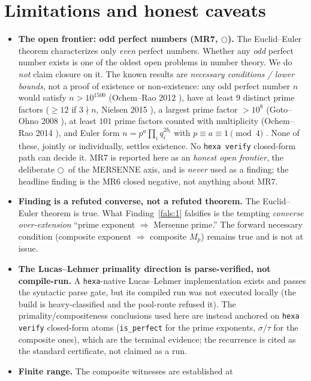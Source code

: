 \documentclass[11pt,a4paper]{article}
\newcommand{\tierO}{\textcolor{orange!85!black}{$\bigcirc$}}       %
\newcommand{\sig}{\sigma}
\newcommand{\Mp}{M_p}
\theoremstyle{definition}
\begin{document}
\section{Limitations and honest caveats}
\label{sec:caveats}

\begin{itemize}\itemsep0.3em
\item \textbf{The open frontier: odd perfect numbers (MR7, \tierO).} The
Euclid--Euler theorem characterizes only \emph{even} perfect numbers. Whether any
\emph{odd} perfect number exists is one of the oldest open problems in number
theory. We do \emph{not} claim closure on it. The known results are
\emph{necessary conditions / lower bounds}, not a proof of existence or
non-existence: any odd perfect number $n$ would satisfy $n > 10^{1500}$
(Ochem--Rao 2012 \citep{ochem-rao-2012}), have at least $9$ distinct prime
factors ($\geq 12$ if $3\nmid n$, Nielsen 2015 \citep{nielsen-2015}), a largest
prime factor $> 10^8$ (Goto--Ohno 2008 \citep{goto-ohno}), at least $101$ prime
factors counted with multiplicity (Ochem--Rao 2014 \citep{ochem-rao-2014}), and
Euler form $n = p^a\prod_i q_i^{2b_i}$ with $p\equiv a\equiv 1\pmod 4$
\citep{euler1849}. None of these, jointly or individually, settles existence. No
\texttt{hexa verify} closed-form path can decide it. MR7 is reported here as an
\emph{honest open frontier}, the deliberate \tierO\ of the MERSENNE axis, and is
\emph{never} used as a finding; the headline finding is the MR6 closed negative,
not anything about MR7.
\item \textbf{Finding is a refuted converse, not a refuted theorem.} The
Euclid--Euler theorem is true. What Finding~\ref{fals:1} falsifies is the
tempting \emph{converse over-extension} ``prime exponent $\Rightarrow$ Mersenne
prime.'' The forward necessary condition (composite exponent $\Rightarrow$
composite $\Mp$) remains true and is not at issue.
\item \textbf{The Lucas--Lehmer primality direction is parse-verified, not
compile-run.} A \texttt{hexa}-native Lucas--Lehmer implementation exists and
passes the syntactic parse gate, but its compiled run was not executed locally
(the build is heavy-classified and the pool-route refused it). The
primality/compositeness conclusions used here are instead anchored on
\texttt{hexa verify} closed-form atoms (\texttt{is\_perfect} for the prime
exponents, $\sig/\tau$ for the composite ones), which are the terminal evidence;
the recurrence is cited as the standard certificate, not claimed as a run.
\item \textbf{Finite range.} The composite witnesses are established at

\end{itemize}
\end{document}
